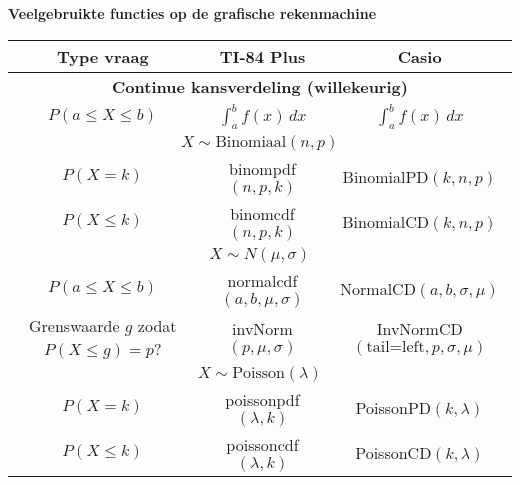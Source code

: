 \textbf{Veelgebruikte functies op de grafische rekenmachine}
\begin{table}[H]
    \centering
    \begin{tabular}{c|c|c}
        \toprule
            \textbf{Type vraag}                     & \textbf{TI-84 Plus}           & \textbf{Casio} \\
        \midrule
            \multicolumn{3}{c}{\textbf{Continue kansverdeling (willekeurig)}} \\ 
        \midrule
            $P(a \le X \le b)$                      & $\int_{a}^{b} f(x)\, dx$      & $\int_{a}^{b} f(x)\, dx$\\
        \midrule    
            \multicolumn{3}{c}{\textbf{$X \sim \text{Binomiaal}(n, p)$}} \\ 
        \midrule
            $P(X = k)$                              & binompdf$(n,p,k)$             & BinomialPD$(k, n, p)$ \\
            $P(X \le k)$                            & binomcdf$(n,p,k)$             & BinomialCD$(k, n, p)$ \\
        \midrule    
            \multicolumn{3}{c}{\textbf{$X \sim N(\mu, \sigma)$}} \\
        \midrule 
            $P(a \le X \le b)$                      & normalcdf$(a,b,\mu,\sigma)$   & NormalCD$(a, b, \sigma, \mu)$ \\
            Grenswaarde $g$ zodat $P(X \le g)=p$?   & invNorm$(p,\mu,\sigma)$       & InvNormCD$(\text{tail=left}, p, \sigma, \mu)$ \\
        \midrule 
            \multicolumn{3}{c}{\textbf{$X \sim \text{Poisson}(\lambda)$}} \\  
        \midrule
            $P(X = k)$                              & poissonpdf$(\lambda, k)$      & PoissonPD$(k, \lambda)$ \\
            $P(X \le k)$                            & poissoncdf$(\lambda, k)$      & PoissonCD$(k, \lambda)$ \\
        \bottomrule
    \end{tabular}
\end{table}
